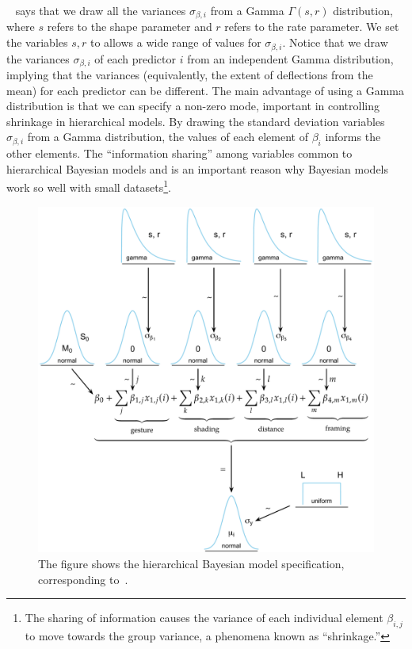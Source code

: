 ~ says that we draw all the variances $\sigma_{\beta, i}$ from a Gamma $\Gamma(s,r)$ distribution, where $s$ refers to the shape parameter and $r$ refers to the rate parameter. We set the variables $s,r$ to allows a wide range of values for $\sigma_{\beta, i}$. Notice that we draw the variances $\sigma_{\beta, i}$ of each predictor $i$ from an independent Gamma distribution, implying that the variances (equivalently, the extent of deflections from the mean) for each predictor can be different. The main advantage of using a Gamma distribution is that we can specify a non-zero mode, important in controlling shrinkage in hierarchical models. By drawing the standard deviation variables $\sigma_{\beta, i}$ from a Gamma distribution, the values of each element of $\beta_i$ informs the other elements. The ``information sharing'' among variables common to hierarchical Bayesian models and is an important reason why Bayesian models work so well with small datasets\footnote{The sharing of information causes the variance of each individual element $\beta_{i,j}$ to move towards the group variance, a phenomena known as ``shrinkage.'' }.



\begin{figure}
 \centering
 \includegraphics[width=\columnwidth]{./figures/generative_model.pdf}
 \caption{The figure shows the hierarchical Bayesian model specification, corresponding to~.}
 \label{fig:generative-main}
\end{figure}

